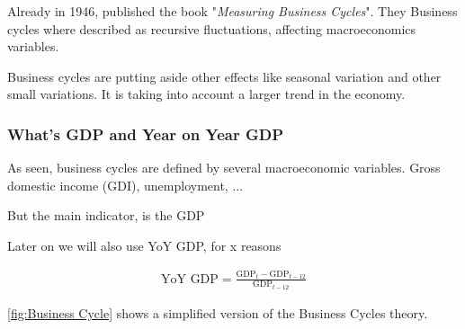 \documentclass[12pt,a4paper,oneside]{book}
\begin{document}
Already in 1946, \citeauthor{mitchell_measuring_1946} published the book "\textit{Measuring Business Cycles}". They 
Business cycles where described as recursive fluctuations, affecting macroeconomics variables.

Business cycles are putting aside other effects like seasonal variation and other small variations. It is taking into account a larger trend in the economy.

\subsubsection{What's GDP and Year on Year GDP}

As seen, business cycles are defined by several macroeconomic variables. 
Gross domestic income (GDI), unemployment, ...

But the main indicator, is the GDP

Later on we will also use YoY GDP, for x reasons

\begin{eqnarray}
   \mbox{YoY GDP} = \frac{\mbox{GDP}_t - \mbox{GDP}_{t-12}}{\mbox{GDP}_{t-12}} 
\end{eqnarray}

\autoref{fig:Business Cycle} shows a simplified version of the Business Cycles theory.
\end{document}
